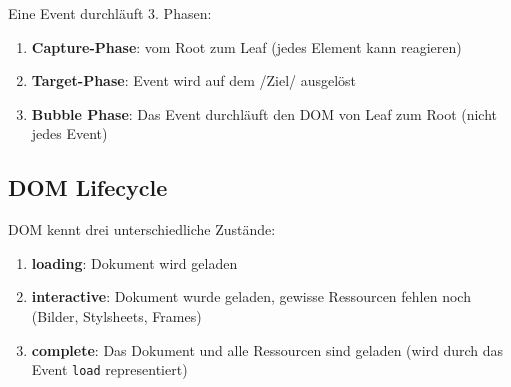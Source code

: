 \documentclass[11pt,twoside,landscape]{article}
\begin{document}
\begin{multicols*}{3}
Eine Event durchläuft 3. Phasen: 
\begin{enumerate}
\item \textbf{Capture-Phase}: vom Root zum Leaf (jedes Element kann reagieren)
\item \textbf{Target-Phase}: Event wird auf dem /Ziel/ ausgelöst
\item \textbf{Bubble Phase}: Das Event durchläuft den DOM von Leaf zum Root (nicht jedes Event)
\end{enumerate}

\subsection{DOM Lifecycle}
DOM kennt drei unterschiedliche Zustände: 
\begin{enumerate}
\item \textbf{loading}: Dokument wird geladen
\item \textbf{interactive}: Dokument wurde geladen, gewisse Ressourcen fehlen noch (Bilder, Stylsheets, Frames)
\item \textbf{complete}: Das Dokument und alle Ressourcen sind geladen (wird durch das Event \verb+load+ representiert)
\end{enumerate}
\end{multicols*}
\end{document}
